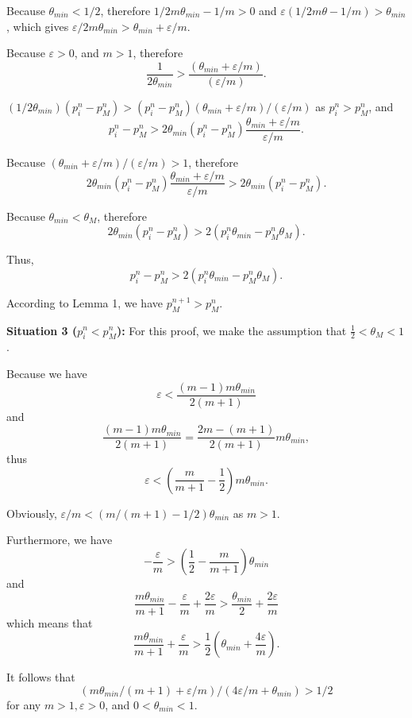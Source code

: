 \documentclass[10pt,journal,cspaper,compsoc,onecolumn]{IEEEtran}
\begin{document}
\begin{spacing}{1.2}
\begin{IEEEproof}
Because $\theta_{min} < 1/2$, therefore
$1/2m\theta_{min} - 1/m > 0$ and
$\varepsilon(1/2m\theta - 1/m) > \theta_{min}$, which gives
$\varepsilon/2m\theta_{min} > \theta_{min} + \varepsilon/m$.

Because $\varepsilon > 0$, and $m > 1$, therefore
 $$\displaystyle\frac{1}{2\theta_{min}} > \displaystyle\frac{(\theta_{min} + \varepsilon/m)}{(\varepsilon/m)}.$$

$(1/2\theta_{min})(p_i^n - p_M^n) > (p_i^n - p_M^n)(\theta_{min} + \varepsilon/m)/(\varepsilon/m)$ as
$p_i^n > p_M^n$, and
$$p_i^n -p_M^n > 2\theta_{min}(p_i^n -p_M^n)\displaystyle\frac{\theta_{min} + \varepsilon/m}{\varepsilon/m}.$$

Because $(\theta_{min} + \varepsilon/m)/(\varepsilon/m) > 1$, therefore
$$2\theta_{min}(p_i^n -p_M^n)\displaystyle\frac{\theta_{min} + \varepsilon/m}{\varepsilon/m} > 2\theta_{min}(p_i^n -p_M^n).$$

Because $\theta_{min} < \theta_M$, therefore
$$2\theta_{min}(p_i^n - p_M^n) > 2(p_i^n\theta_{min} - p_M^n\theta_M).$$

Thus,
$$p_i^n -p_M^n > 2(p_i^n\theta_{min} - p_M^n\theta_M).$$

According to Lemma 1, we have $p_M^{n + 1} > p_M^{n}$.

\textbf{Situation 3 ($p_i^n < p_M^n$):}
For this proof, we make the assumption that $\frac{1}{2} < \theta_M < 1$.

Because we have
$$\varepsilon < \displaystyle\frac{(m - 1)m\theta_{min}}{2(m + 1)}$$
and
$$\displaystyle\frac{(m - 1)m\theta_{min}}{2(m + 1)} = \displaystyle\frac{2m -(m + 1)}{2(m + 1)}m\theta_{min},$$
thus
$$\varepsilon < (\displaystyle\frac{m}{m +1} - \displaystyle\frac{1}{2})m\theta_{min}.$$

Obviously, $\varepsilon/m < (m/(m + 1) - 1/2)\theta_{min}$ as $m > 1$.

Furthermore, we have
$$-\displaystyle\frac{\varepsilon}{m} > (\displaystyle\frac{1}{2} - \displaystyle\frac{m}{m + 1})\theta_{min}$$
and
$$\displaystyle\frac{m\theta_{min}}{m + 1} - \displaystyle\frac{\varepsilon}{m} + \displaystyle\frac{2\varepsilon}{m} > \displaystyle\frac{\theta_{min}}{2} + \displaystyle\frac{2\varepsilon}{m}$$
which means that
$$\displaystyle\frac{m\theta_{min}}{m + 1} + \displaystyle\frac{\varepsilon}{m}  > \displaystyle\frac{1}{2}(\theta_{min} + \displaystyle\frac{4\varepsilon}{m}).$$

It follows that
$$(m\theta_{min}/(m + 1) + \varepsilon/m)/(4\varepsilon/m + \theta_{min}) > 1/2$$ for any $m > 1, \varepsilon > 0$, and $0 < \theta_{min} < 1$.


\end{IEEEproof}
\end{spacing}
\end{document}
